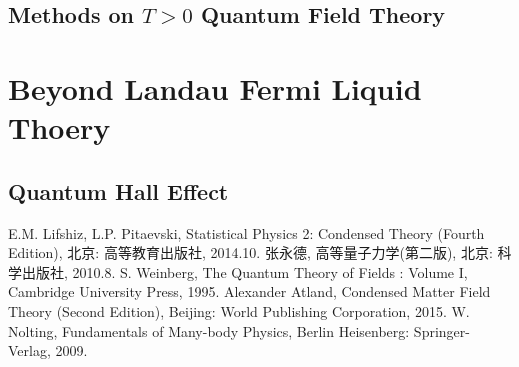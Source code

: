 \documentclass[b5paper,10pt,UTF8]{book}
\numberwithin{equation}{section}
\begin{document}
\chapter{Methods on $T>0$ Quantum Field Theory}

\part{Beyond Landau Fermi Liquid Thoery}

\chapter{Quantum Hall Effect}

\begin{thebibliography}{9}
	E.M. Lifshiz, L.P. Pitaevski, Statistical Physics 2: Condensed Theory (Fourth Edition), 北京: 高等教育出版社, 2014.10.
	张永德, 高等量子力学(第二版), 北京: 科学出版社, 2010.8.
	S. Weinberg, The Quantum Theory of Fields : Volume I, Cambridge University Press, 1995.
	Alexander Atland, Condensed Matter Field Theory (Second Edition), Beijing: World Publishing Corporation, 2015.
	W. Nolting, Fundamentals of Many-body Physics, Berlin Heisenberg: Springer-Verlag, 2009.
\end{thebibliography}

	
\end{document}
